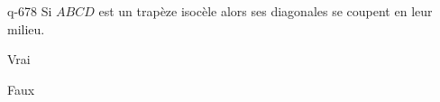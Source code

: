 \begin{truefalse}{q-678}
Si  $ABCD$ est un trapèze isocèle alors ses diagonales se coupent en leur milieu.
\item Vrai
\item* Faux
\end{truefalse}

